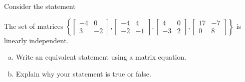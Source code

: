 
\begin{exerciseStatement}


Consider the statement 
\begin{center}\begin{minipage}{0.8\textwidth}
 The set of matrices \( \left\{ \left[\begin{array}{cc}
-4 & 0 \\
3 & -2
\end{array}\right] , \left[\begin{array}{cc}
-4 & 4 \\
-2 & -1
\end{array}\right] , \left[\begin{array}{cc}
4 & 0 \\
-3 & 2
\end{array}\right] , \left[\begin{array}{cc}
17 & -7 \\
0 & 8
\end{array}\right] \right\} \) is linearly independent.
\end{minipage}\end{center}
    


\begin{enumerate}[(a)]
\item  Write an equivalent statement using a matrix equation.
\item  Explain why your statement is true or false.
\end{enumerate}
    
\end{exerciseStatement}
    
